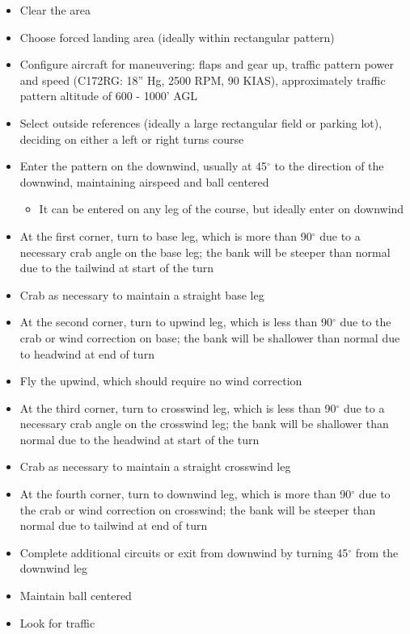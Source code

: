 \begin{itemize}
  \item Clear the area
  \item Choose forced landing area (ideally within rectangular pattern) \item
    Configure aircraft for maneuvering: flaps and gear up, traffic pattern
    power and speed (C172RG: 18'' Hg, 2500 RPM, 90 KIAS), approximately traffic
    pattern altitude of 600 - 1000' AGL
  \item Select outside references (ideally a large rectangular field or parking
    lot), deciding on either a left or right turns course 
  \item Enter the pattern on the downwind, usually at 45$^\circ$ to the
    direction of the downwind, maintaining airspeed and ball centered
    \begin{itemize}
      \item It can be entered on any leg of the course, but ideally enter on
        downwind
    \end{itemize}
  \item At the first corner, turn to base leg, which is more than 90$^\circ$
    due to a necessary crab angle on the base leg; the bank will be steeper
    than normal due to the tailwind at start of the turn
  \item Crab as necessary to maintain a straight base leg
  \item At the second corner, turn to upwind leg, which is less than 90$^\circ$
    due to the crab or wind correction on base; the bank will be shallower than
    normal due to headwind at end of turn
  \item Fly the upwind, which should require no wind correction
  \item At the third corner, turn to crosswind leg, which is less than
    90$^\circ$ due to a necessary crab angle on the crosswind leg; the bank
    will be shallower than normal due to the headwind at start of the turn
  \item Crab as necessary to maintain a straight crosswind leg
  \item At the fourth corner, turn to downwind leg, which is more than
    90$^\circ$ due to the crab or wind correction on crosswind; the bank will
    be steeper than normal due to tailwind at end of turn
  \item Complete additional circuits or exit from downwind by turning
    45$^\circ$ from the downwind leg
  \item Maintain ball centered
  \item Look for traffic
\end{itemize}

